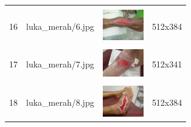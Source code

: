 \begin{table}[H]
\begin{tabular}{|m{0.2in}|m{1.2in}|m{0.7in}|m{0.7in}|}
		& &  &  \\
		16& 
		luka\_merah/6.jpg &
		\includegraphics[width=0.7in]{gambar/dataset_citra/luka_merah/6.jpg}&
		512x384\\
		\hline
		
		& &  &  \\
		17& 
		luka\_merah/7.jpg &
		\includegraphics[width=0.7in]{gambar/dataset_citra/luka_merah/7.jpg}&
		512x341\\
		\hline
		
		& &  &  \\
		18& 
		luka\_merah/8.jpg &
		\includegraphics[width=0.7in]{gambar/dataset_citra/luka_merah/8.jpg}&
		512x384\\
		\hline
		
	\end{tabular}
\end{table}

